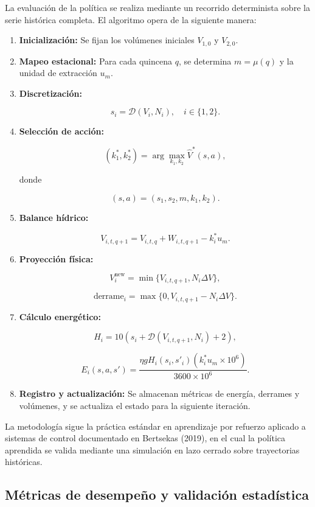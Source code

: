 \documentclass[
  letterpaper,
  DIV=11,
  numbers=noendperiod]{scrreprt}
\theoremstyle{definition}
\theoremstyle{remark}
\begin{document}
La evaluación de la política se realiza mediante un recorrido
determinista sobre la serie histórica completa. El algoritmo opera de la
siguiente manera:

\begin{enumerate}
\def\labelenumi{\arabic{enumi}.}
\item
  \textbf{Inicialización:} Se fijan los volúmenes iniciales \(V_{1,0}\)
  y \(V_{2,0}\).
\item
  \textbf{Mapeo estacional:} Para cada quincena \(q\), se determina
  \(m = \mu(q)\) y la unidad de extracción \(u_m\).
\item
  \textbf{Discretización:}

  \[
  s_i = \mathcal{D}(V_i,N_i),
  \quad i\in\{1,2\}.
  \]
\item
  \textbf{Selección de acción:}

  \[
  (k_1^*,k_2^*)
  =
  \arg\max_{k_1,k_2}\hat{V}^{*}(s,a),
  \]

  donde

  \[
  (s,a)=(s_1,s_2,m,k_1,k_2).
  \]
\item
  \textbf{Balance hídrico:}

  \[
  V_{i,t,q+1}
  =
  V_{i,t,q}
  +
  W_{i,t,q+1}
  -
  k_i^*u_m.
  \]
\item
  \textbf{Proyección física:}

  \[
  V_i^{\text{new}}
  =
  \min\{V_{i,t,q+1},N_i\Delta V\},
  \]

  \[
  \text{derrame}_i
  =
  \max\{0,V_{i,t,q+1}-N_i\Delta V\}.
  \]
\item
  \textbf{Cálculo energético:}

  \[
  H_i
  =
  10\left(s_i+\mathcal{D}(V_{i,t,q+1},N_i)+2\right),
  \]

  \[
  E_i(s,a,s')
  =
  \frac{\eta g H_i(s_i,s'_i)\left(k_i^*u_m\times10^6\right)}
       {3600\times10^6}.
  \]
\item
  \textbf{Registro y actualización:} Se almacenan métricas de energía,
  derrames y volúmenes, y se actualiza el estado para la siguiente
  iteración.
\end{enumerate}

La metodología sigue la práctica estándar en aprendizaje por refuerzo
aplicado a sistemas de control documentado en Bertsekas (2019), en el
cual la política aprendida se valida mediante una simulación en lazo
cerrado sobre trayectorias históricas.

\subsection{Métricas de desempeño y validación
estadística}\label{muxe9tricas-de-desempeuxf1o-y-validaciuxf3n-estaduxedstica}
\end{document}
